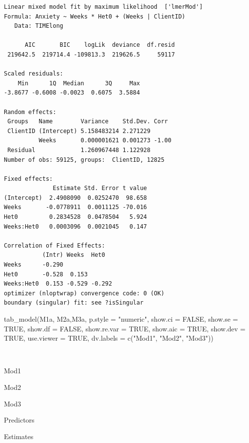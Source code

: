 \documentclass[
  english,
]{book}
\newenvironment{Shaded}{\begin{snugshade}}{\end{snugshade}}
\newcommand{\AttributeTok}[1]{\textcolor[rgb]{0.77,0.63,0.00}{#1}}
\newcommand{\ConstantTok}[1]{\textcolor[rgb]{0.00,0.00,0.00}{#1}}
\newcommand{\FunctionTok}[1]{\textcolor[rgb]{0.00,0.00,0.00}{#1}}
\newcommand{\NormalTok}[1]{#1}
\newcommand{\StringTok}[1]{\textcolor[rgb]{0.31,0.60,0.02}{#1}}
\begin{document}
\begin{verbatim}
Linear mixed model fit by maximum likelihood  ['lmerMod']
Formula: Anxiety ~ Weeks * Het0 + (Weeks | ClientID)
   Data: TIMElong

      AIC       BIC    logLik  deviance  df.resid 
 219642.5  219714.4 -109813.3  219626.5     59117 

Scaled residuals: 
    Min      1Q  Median      3Q     Max 
-3.8677 -0.6008 -0.0023  0.6075  3.5884 

Random effects:
 Groups   Name        Variance    Std.Dev. Corr 
 ClientID (Intercept) 5.158483214 2.271229      
          Weeks       0.000001621 0.001273 -1.00
 Residual             1.260967448 1.122928      
Number of obs: 59125, groups:  ClientID, 12825

Fixed effects:
              Estimate Std. Error t value
(Intercept)  2.4908090  0.0252470  98.658
Weeks       -0.0778911  0.0011125 -70.016
Het0         0.2834528  0.0478504   5.924
Weeks:Het0   0.0003096  0.0021045   0.147

Correlation of Fixed Effects:
           (Intr) Weeks  Het0  
Weeks      -0.290              
Het0       -0.528  0.153       
Weeks:Het0  0.153 -0.529 -0.292
optimizer (nloptwrap) convergence code: 0 (OK)
boundary (singular) fit: see ?isSingular
\end{verbatim}

\begin{Shaded}
\begin{Highlighting}[]
\FunctionTok{tab\_model}\NormalTok{(M1a, M2a,M3a, }\AttributeTok{p.style =} \StringTok{"numeric"}\NormalTok{, }\AttributeTok{show.ci =} \ConstantTok{FALSE}\NormalTok{, }\AttributeTok{show.se =} \ConstantTok{TRUE}\NormalTok{, }\AttributeTok{show.df =} \ConstantTok{FALSE}\NormalTok{, }\AttributeTok{show.re.var =} \ConstantTok{TRUE}\NormalTok{, }\AttributeTok{show.aic =} \ConstantTok{TRUE}\NormalTok{, }\AttributeTok{show.dev =} \ConstantTok{TRUE}\NormalTok{, }\AttributeTok{use.viewer =} \ConstantTok{TRUE}\NormalTok{, }\AttributeTok{dv.labels =} \FunctionTok{c}\NormalTok{(}\StringTok{"Mod1"}\NormalTok{, }\StringTok{"Mod2"}\NormalTok{, }\StringTok{"Mod3"}\NormalTok{))}
\end{Highlighting}
\end{Shaded}

~

Mod1

Mod2

Mod3

Predictors

Estimates
\end{document}

